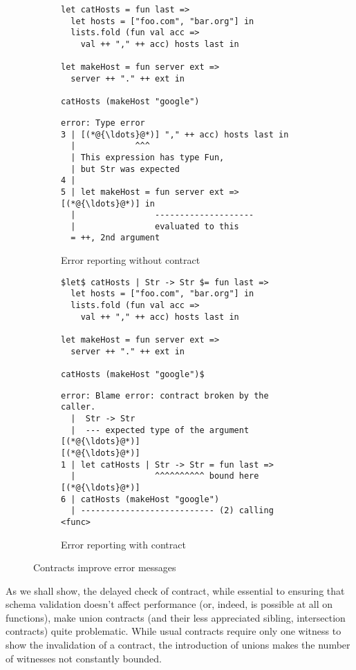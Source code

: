 \documentclass[sigplan,screen,10pt]{acmart}
\begin{document}
\begin{figure*}
  \centering
  \begin{subfigure}[b]{0.48\linewidth}
    \begin{lstlisting}[language=nickel]
let catHosts = fun last =>
  let hosts = ["foo.com", "bar.org"] in
  lists.fold (fun val acc =>
    val ++ "," ++ acc) hosts last in

let makeHost = fun server ext =>
  server ++ "." ++ ext in

catHosts (makeHost "google")
\end{lstlisting}

    \begin{lstlisting}[frame=none,numbers=none, basicstyle=\footnotesize\ttfamily]
error: Type error
3 | [(*@{\ldots}@*)] "," ++ acc) hosts last in
  |            ^^^
  | This expression has type Fun,
  | but Str was expected
4 |
5 | let makeHost = fun server ext => [(*@{\ldots}@*)] in
  |                --------------------
  |                evaluated to this
  = ++, 2nd argument
\end{lstlisting}
    \caption{Error reporting without contract}
    \label{fig:contract-reporting-wo}
  \end{subfigure}
  \hfill
  \begin{subfigure}[b]{0.48\linewidth}
    \begin{lstlisting}[language=nickel]
$let$ catHosts | Str -> Str $= fun last =>
  let hosts = ["foo.com", "bar.org"] in
  lists.fold (fun val acc =>
    val ++ "," ++ acc) hosts last in

let makeHost = fun server ext =>
  server ++ "." ++ ext in

catHosts (makeHost "google")$
\end{lstlisting}
    \begin{lstlisting}[frame=none,numbers=none, basicstyle=\footnotesize\ttfamily]
error: Blame error: contract broken by the caller.
  |  Str -> Str
  |  --- expected type of the argument [(*@{\ldots}@*)]
[(*@{\ldots}@*)]
1 | let catHosts | Str -> Str = fun last =>
  |                ^^^^^^^^^^ bound here
[(*@{\ldots}@*)]
6 | catHosts (makeHost "google")
  | --------------------------- (2) calling <func>
    \end{lstlisting}
    \caption{Error reporting with contract}
    \label{fig:contract-reporting-w}
  \end{subfigure}
  \caption{Contracts improve error messages}
\end{figure*}

As we shall show, the delayed check of contract, while essential to
ensuring that schema validation doesn't affect performance (or, indeed,
is possible at all on functions), make union contracts (and their less
appreciated sibling, intersection contracts) quite problematic.
While usual contracts require only one witness to show the invalidation
of a contract, the introduction of unions makes
the number of witnesses not constantly bounded.
\end{document}
